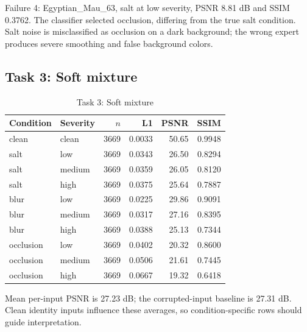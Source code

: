 \documentclass[conference]{IEEEtran}
\begin{document}
Failure 4: Egyptian\_Mau\_63, salt at low severity, PSNR 8.81 dB and SSIM 0.3762. 
The classifier selected occlusion, differing from the true salt condition. 
Salt noise is misclassified as occlusion on a dark background; the wrong expert produces severe smoothing and false background colors.

\subsection{Task 3: Soft mixture}

\begin{table}[!ht]\centering\caption{Task 3: Soft mixture}\scriptsize

\begin{tabular}{llrrrr}\toprule Condition & Severity & $n$ & L1 & PSNR & SSIM\\\midrule

clean & clean & 3669 & 0.0033 & 50.65 & 0.9948\\

salt & low & 3669 & 0.0343 & 26.50 & 0.8294\\

salt & medium & 3669 & 0.0359 & 26.05 & 0.8120\\

salt & high & 3669 & 0.0375 & 25.64 & 0.7887\\

blur & low & 3669 & 0.0225 & 29.86 & 0.9091\\

blur & medium & 3669 & 0.0317 & 27.16 & 0.8395\\

blur & high & 3669 & 0.0388 & 25.13 & 0.7344\\

occlusion & low & 3669 & 0.0402 & 20.32 & 0.8600\\

occlusion & medium & 3669 & 0.0506 & 21.61 & 0.7445\\

occlusion & high & 3669 & 0.0667 & 19.32 & 0.6418\\

\bottomrule\end{tabular}\end{table}

Mean per-input PSNR is 27.23 dB; the corrupted-input baseline is 27.31 dB. Clean identity inputs influence these averages, so condition-specific rows should guide interpretation.
\end{document}
